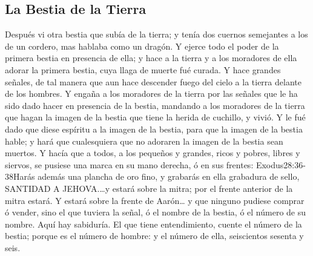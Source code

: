 \subsection*{La Bestia de la Tierra}
Después vi otra bestia que subía de la tierra; y tenía dos cuernos%
 semejantes a los de un cordero, mas hablaba como un dragón. 
Y ejerce todo el poder de la primera bestia en presencia de ella; y hace a la tierra y a los moradores de ella adorar la primera bestia, cuya llaga de muerte fué curada. 
Y hace grandes señales, de tal manera que aun hace descender fuego del cielo a la tierra delante de los hombres.%
Y engaña a los moradores de la tierra por las señales que le ha sido dado hacer en presencia de la bestia, mandando a los moradores de la tierra que hagan la imagen de la bestia que tiene la herida de cuchillo, y vivió. 
Y le fué dado que diese espíritu a la imagen de la bestia, para que la imagen de la bestia hable; y hará que cualesquiera que no adoraren la imagen de la bestia sean muertos.%
Y hacía que a todos, a los pequeños y grandes, ricos y pobres, libres y siervos, se pusiese una marca en su mano derecha, ó en sus frentes:%
				  {Exodus}{28:36-38}{Harás además una plancha de oro fino, y grabarás en ella grabadura de sello, SANTIDAD A JEHOVA.\ldots y estará sobre la mitra; por el frente anterior de la mitra estará. Y estará sobre la frente de Aarón\ldots}
y que ninguno pudiese comprar ó vender, sino el que tuviera la señal, ó el nombre de la bestia, ó el número de su nombre. 
Aquí hay sabiduría. El que tiene entendimiento, cuente el número de la bestia; porque es el número de hombre: y el número de ella, seiscientos sesenta y seis.
